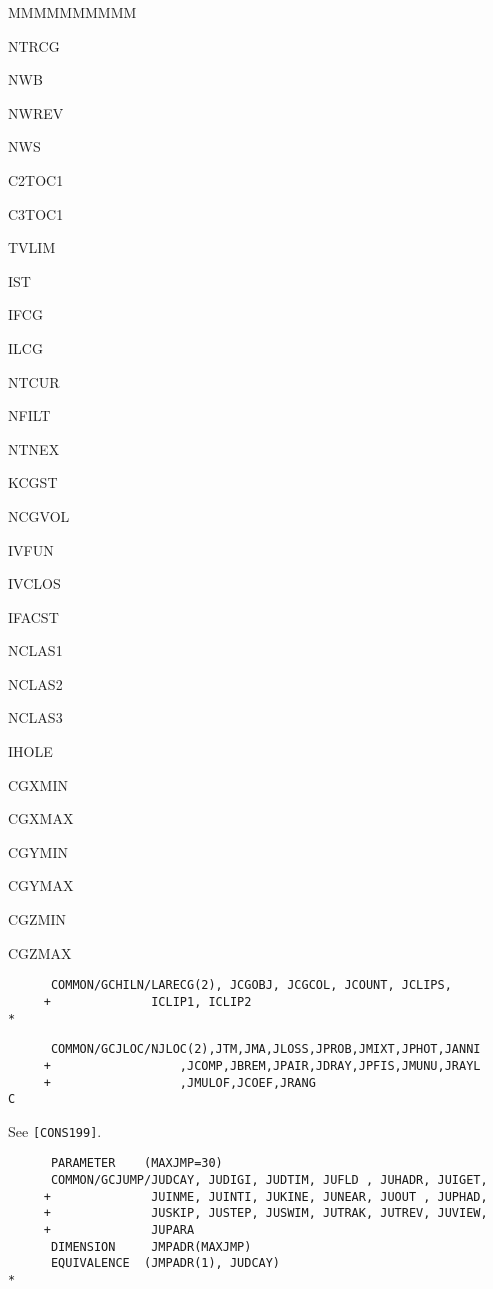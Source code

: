 \begin{DLtt}{MMMMMMMMMM}
\item[NTRCG]
\item[NWB]
\item[NWREV]
\item[NWS]
\item[C2TOC1]
\item[C3TOC1]
\item[TVLIM]
\item[IST]
\item[IFCG]
\item[ILCG]
\item[NTCUR]
\item[NFILT]
\item[NTNEX]
\item[KCGST]
\item[NCGVOL]
\item[IVFUN]
\item[IVCLOS]
\item[IFACST]
\item[NCLAS1]
\item[NCLAS2]
\item[NCLAS3]
\item[IHOLE]
\item[CGXMIN]
\item[CGXMAX]
\item[CGYMIN]
\item[CGYMAX]
\item[CGZMIN]
\item[CGZMAX]
\end{DLtt}
\begin{verbatim}
      COMMON/GCHILN/LARECG(2), JCGOBJ, JCGCOL, JCOUNT, JCLIPS,
     +              ICLIP1, ICLIP2
*
\end{verbatim}
\begin{verbatim}
      COMMON/GCJLOC/NJLOC(2),JTM,JMA,JLOSS,JPROB,JMIXT,JPHOT,JANNI
     +                  ,JCOMP,JBREM,JPAIR,JDRAY,JPFIS,JMUNU,JRAYL
     +                  ,JMULOF,JCOEF,JRANG
C
\end{verbatim}
 
See {\tt [CONS199]}.
\begin{verbatim}
      PARAMETER    (MAXJMP=30)
      COMMON/GCJUMP/JUDCAY, JUDIGI, JUDTIM, JUFLD , JUHADR, JUIGET,
     +              JUINME, JUINTI, JUKINE, JUNEAR, JUOUT , JUPHAD,
     +              JUSKIP, JUSTEP, JUSWIM, JUTRAK, JUTREV, JUVIEW,
     +              JUPARA
      DIMENSION     JMPADR(MAXJMP)
      EQUIVALENCE  (JMPADR(1), JUDCAY)
*
\end{verbatim}
 
